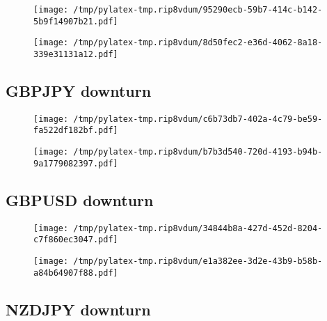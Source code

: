 \documentclass{article}%
\begin{document}
\begin{figure}[htbp]%
\centering%
\texttt{[image: /tmp/pylatex-tmp.rip8vdum/95290ecb-59b7-414c-b142-5b9f14907b21.pdf]}%
\end{figure}

%


\begin{figure}[htbp]%
\centering%
\texttt{[image: /tmp/pylatex-tmp.rip8vdum/8d50fec2-e36d-4062-8a18-339e31131a12.pdf]}%
\end{figure}

%
\newpage %
\subsection{GBPJPY downturn}%
\label{subsec:GBPJPYdownturn}%


\begin{figure}[htbp]%
\centering%
\texttt{[image: /tmp/pylatex-tmp.rip8vdum/c6b73db7-402a-4c79-be59-fa522df182bf.pdf]}%
\end{figure}

%


\begin{figure}[htbp]%
\centering%
\texttt{[image: /tmp/pylatex-tmp.rip8vdum/b7b3d540-720d-4193-b94b-9a1779082397.pdf]}%
\end{figure}

%
\newpage %
\subsection{GBPUSD downturn}%
\label{subsec:GBPUSDdownturn}%


\begin{figure}[htbp]%
\centering%
\texttt{[image: /tmp/pylatex-tmp.rip8vdum/34844b8a-427d-452d-8204-c7f860ec3047.pdf]}%
\end{figure}

%


\begin{figure}[htbp]%
\centering%
\texttt{[image: /tmp/pylatex-tmp.rip8vdum/e1a382ee-3d2e-43b9-b58b-a84b64907f88.pdf]}%
\end{figure}

%
\newpage %
\subsection{NZDJPY downturn}%
\label{subsec:NZDJPYdownturn}%
\end{document}

